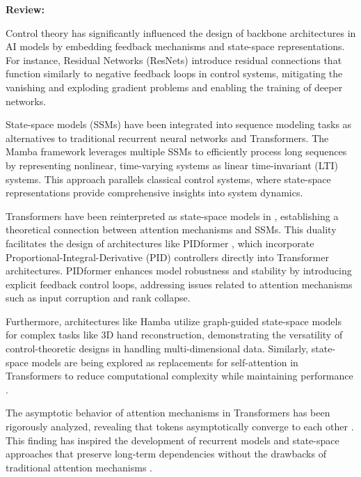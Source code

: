 \documentclass{article}
\theoremstyle{plain}
\theoremstyle{definition}
\theoremstyle{remark}
\begin{document}
\textbf{Review:}

Control theory has significantly influenced the design of backbone architectures in AI models by embedding feedback mechanisms and state-space representations. For instance, Residual Networks (ResNets) \cite{heDeepResidualLearning2015} introduce residual connections that function similarly to negative feedback loops in control systems, mitigating the vanishing and exploding gradient problems and enabling the training of deeper networks.

State-space models (SSMs) have been integrated into sequence modeling tasks as alternatives to traditional recurrent neural networks and Transformers. The Mamba framework \cite{guMambaLineartimeSequence} leverages multiple SSMs to efficiently process long sequences by representing nonlinear, time-varying systems as linear time-invariant (LTI) systems. This approach parallels classical control systems, where state-space representations provide comprehensive insights into system dynamics.

Transformers have been reinterpreted as state-space models in \cite{daoTransformersAreSSMs2024}, establishing a theoretical connection between attention mechanisms and SSMs. This duality facilitates the design of architectures like PIDformer \cite{nguyenPIDformerTransformerMeets2024}, which incorporate Proportional-Integral-Derivative (PID) controllers directly into Transformer architectures. PIDformer enhances model robustness and stability by introducing explicit feedback control loops, addressing issues related to attention mechanisms such as input corruption and rank collapse.

Furthermore, architectures like Hamba \cite{dongHambaSingleview3D2024} utilize graph-guided state-space models for complex tasks like 3D hand reconstruction, demonstrating the versatility of control-theoretic designs in handling multi-dimensional data. Similarly, state-space models are being explored as replacements for self-attention in Transformers to reduce computational complexity while maintaining performance \cite{wangStateSpaceModel2024}.

The asymptotic behavior of attention mechanisms in Transformers has been rigorously analyzed, revealing that tokens asymptotically converge to each other \cite{abellaAsymptoticBehaviorAttention2024}. This finding has inspired the development of recurrent models and state-space approaches that preserve long-term dependencies without the drawbacks of traditional attention mechanisms \cite{tiezziStatespaceModelingLong2024}.
\end{document}
